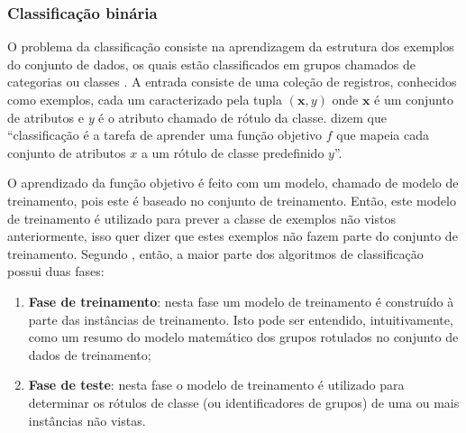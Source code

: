         \subsubsection{Classificação binária} \label{subsubsec:Classificação-binária}
            O problema da classificação consiste na aprendizagem da estrutura dos exemplos do conjunto de dados, os quais estão classificados em grupos chamados de categorias ou classes \cite[p.~285]{Aggarwal_DMTT_2015}.
            A entrada consiste de uma coleção de registros, conhecidos como exemplos, cada um caracterizado pela tupla $(\textbf{x},y)$ onde $\textbf{x}$ é um conjunto de atributos e \textit{y} é o atributo chamado de rótulo da classe.
             dizem que ``classificação é a tarefa de aprender uma função objetivo $f$ que mapeia cada conjunto de atributos $x$ a um rótulo de classe predefinido $y$''.
        
            O aprendizado da função objetivo é feito com um modelo, chamado de modelo de treinamento, pois este é baseado no conjunto de treinamento. 
            Então, este modelo de treinamento é utilizado para prever a classe de exemplos não vistos anteriormente, isso quer dizer que estes exemplos não fazem parte do conjunto de treinamento.
            Segundo , então, a maior parte dos algoritmos de classificação possui duas fases:
            \begin{enumerate}
                \item \textbf{Fase de treinamento}: nesta fase um modelo de treinamento é construído à parte das instâncias de treinamento. Isto pode ser entendido, intuitivamente, como um resumo do modelo matemático dos grupos rotulados no conjunto de dados de treinamento;
                
                \item \textbf{Fase de teste}: nesta fase o modelo de treinamento é utilizado para determinar os rótulos de classe (ou identificadores de grupos) de uma ou mais instâncias não vistas.
            \end{enumerate}
                

